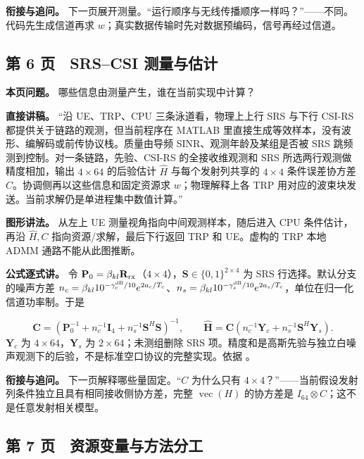 \documentclass[11pt,a4paper]{ctexart}
\begin{document}
\textbf{衔接与追问。} 下一页展开测量。“运行顺序与无线传播顺序一样吗？”——不同。代码先生成信道再求 $w$；真实数据传输时先对数据预编码，信号再经过信道。\par

\subsection*{第 6 页　SRS–CSI 测量与估计}

\textbf{本页问题。} 哪些信息由测量产生，谁在当前实现中计算？\par

\textbf{直接讲稿。} “沿 UE、TRP、CPU 三条泳道看，物理上上行 SRS 与下行 CSI-RS 都提供关于链路的观测，但当前程序在 MATLAB 里直接生成等效样本，没有波形、编解码或前传协议栈。质量由导频 SINR、观测年龄及某组是否被 SRS 跳频测到控制。对一条链路，先验、CSI-RS 的全接收维观测和 SRS 所选两行观测做精度相加，输出 $4\times64$ 的后验估计 $\widehat H$ 与每个发射列共享的 $4\times4$ 条件误差协方差 $C$。协调侧再以这些信息和固定资源求 $w$；物理解释上各 TRP 用对应的波束块发送。当前求解仍是单进程集中数值计算。”\par

\textbf{图形讲法。} 从左上 UE 测量视角指向中间观测样本，随后进入 CPU 条件估计，再沿 $\widehat H,C$ 指向资源/求解，最后下行返回 TRP 和 UE。虚构的 TRP 本地 ADMM 通路不能从此图推断。\par

\textbf{公式逐式讲。} 令 $\mathbf P_0=\beta_{kl}\mathbf R_{\rm rx}$（$4\times4$），$\mathbf S\in\{0,1\}^{2\times4}$ 为 SRS 行选择。默认分支的噪声方差 $n_c=\beta_{kl}10^{-\gamma_c^{\rm dB}/10}e^{2a_c/T_c}$、$n_s=\beta_{kl}10^{-\gamma_s^{\rm dB}/10}e^{2a_s/T_c}$，单位在归一化信道功率制。于是\par
\[
\mathbf C=(\mathbf P_0^{-1}+n_c^{-1}\mathbf I_4+n_s^{-1}\mathbf S^H\mathbf S)^{-1},\qquad
\widehat{\mathbf H}=\mathbf C(n_c^{-1}\mathbf Y_c+n_s^{-1}\mathbf S^H\mathbf Y_s).
\]
$\mathbf Y_c$ 为 $4\times64$，$\mathbf Y_s$ 为 $2\times64$；未测组删除 SRS 项。精度和是高斯先验与独立白噪声观测下的后验，不是标准空口协议的完整实现。依据 。\par

\textbf{衔接与追问。} 下一页解释哪些量固定。“$C$ 为什么只有 $4\times4$？”——当前假设发射列条件独立且具有相同接收侧协方差，完整 $\operatorname{vec}(H)$ 的协方差是 $I_{64}\otimes C$；这不是任意发射相关模型。\par

\subsection*{第 7 页　资源变量与方法分工}
\end{document}
